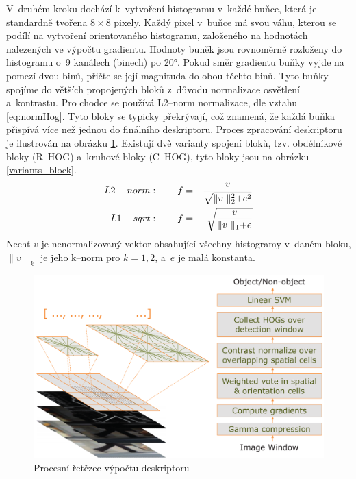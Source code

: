 V~druhém kroku dochází k~vytvoření histogramu v~každé buňce, která je standardně tvořena $8\times8$ pixely. Každý pixel v~buňce má svou váhu, kterou se podílí na vytvoření orientovaného histogramu, založeného na hodnotách nalezených ve výpočtu gradientu. Hodnoty buněk jsou rovnoměrně rozloženy do histogramu o~9 kanálech (binech) po \ang{20}. Pokud směr gradientu buňky vyjde na pomezí dvou binů, přičte se její magnituda do obou těchto binů.
Tyto buňky spojíme do větších propojených bloků z~důvodu normalizace osvětlení a~kontrastu. Pro chodce se používá L2--norm normalizace, dle vztahu \eqref{eq:normHog}. Tyto bloky se typicky překrývají, což znamená, že každá buňka přispívá více než jednou do finálního deskriptoru. Proces zpracování deskriptoru je ilustrován na obrázku \ref{hog_chain}. Existují dvě varianty spojení bloků, tzv. obdélníkové bloky (R--HOG) a~kruhové bloky (C--HOG), tyto bloky jsou na obrázku \ref{variants_block}.  
\begin{equation}
\centering
 \label{eq:normHog}
 \begin{aligned}
L2-norm&: \qquad  f =& \frac{v}{\sqrt{\lVert v~\lVert_2^2 + e^2}} \\
L1-sqrt&: \qquad  f =& \sqrt{\frac{v}{\lVert v~\lVert_1 + e}}
 \end{aligned}
\end{equation}
Nechť $v$ je nenormalizovaný vektor obsahující všechny histogramy v~daném bloku, $\lVert v~\lVert_k$ je jeho k--norm pro $k = 1,2$, a~$e$ je malá konstanta.
 \begin{figure}[H]
\centering
\includegraphics[width=16cm]{figures/hog_pipeline}
\caption{Procesní řetězec výpočtu deskriptoru \cite{hog:dalal}}
\label{hog_chain}
\end{figure}

